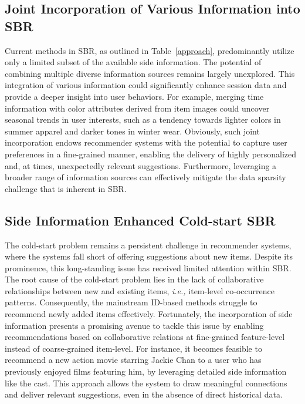 \documentclass[lettersize,journal]{IEEEtran}
\newcommand{\ie}{\emph{i.e.,}\xspace}
\begin{document}
\subsection{Joint Incorporation of Various Information into SBR} 
Current methods in SBR, as outlined in Table~\ref{approach}, predominantly utilize only a limited subset of the available side information. The potential of combining multiple diverse information sources remains largely unexplored. This integration of various information could significantly enhance session data and provide a deeper insight into user behaviors. For example, merging time information with color attributes derived from item images could uncover seasonal trends in user interests, such as a tendency towards lighter colors in summer apparel and darker tones in winter wear. Obviously, such joint incorporation endows recommender systems with the potential to capture user preferences in a fine-grained manner, enabling the delivery of highly personalized and, at times, unexpectedly relevant suggestions. Furthermore, leveraging a broader range of information sources can effectively mitigate the data sparsity challenge that is inherent in SBR.

\subsection{Side Information Enhanced Cold-start SBR}
The cold-start problem remains a persistent challenge in recommender systems, where the systems fall short of offering suggestions about new items. Despite its prominence, this long-standing issue has received limited attention within SBR. The root cause of the cold-start problem lies in the lack of collaborative relationships between new and existing items, \ie item-level co-occurrence patterns. Consequently, the mainstream ID-based methods struggle to recommend newly added items effectively. Fortunately, the incorporation of side information presents a promising avenue to tackle this issue by enabling recommendations based on collaborative relations at fine-grained feature-level instead of coarse-grained item-level. For instance, it becomes feasible to recommend a new action movie starring Jackie Chan to a user who has previously enjoyed films featuring him, by leveraging detailed side information like the cast. This approach allows the system to draw meaningful connections and deliver relevant suggestions, even in the absence of direct historical data.
\end{document}
